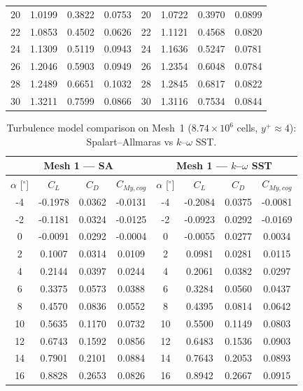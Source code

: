 \begin{table}[!ht]
\begin{tabular}{c c c c | c c c c}
20 & 1.0199  & 0.3822 & 0.0753  & 20 & 1.0722  & 0.3970 & 0.0899 \\
22 & 1.0853  & 0.4502 & 0.0626  & 22 & 1.1121  & 0.4568 & 0.0820 \\
24 & 1.1309  & 0.5119 & 0.0943  & 24 & 1.1636  & 0.5247 & 0.0781 \\
26 & 1.2046  & 0.5903 & 0.0949  & 26 & 1.2354  & 0.6048 & 0.0784 \\
28 & 1.2489  & 0.6651 & 0.1032  & 28 & 1.2845  & 0.6817 & 0.0822 \\
30 & 1.3211  & 0.7599 & 0.0866  & 30 & 1.3116  & 0.7534 & 0.0844 \\
\hline
\end{tabular}
\end{table}

\begin{table}[!ht]
\centering
\caption{Turbulence model comparison on Mesh~1 ($8.74\times10^{6}$ cells, $y^{+}\approx 4$): Spalart--Allmaras vs $k$--$\omega$ SST.}
\label{tab:tm_mesh1}
\setlength{\tabcolsep}{6pt}
\renewcommand{\arraystretch}{1.15}
\begin{tabular}{c c c c | c c c c}
\hline
\multicolumn{4}{c|}{\textbf{Mesh 1 --- SA}} &
\multicolumn{4}{c}{\textbf{Mesh 1 --- $k$--$\omega$ SST}}\\
\hline
$\alpha$ [$^\circ$] & $C_L$ & $C_D$ & $C_{My,cog}$ &
$\alpha$ [$^\circ$] & $C_L$ & $C_D$ & $C_{My,cog}$\\
\hline
-4 & -0.1978 & 0.0362 & -0.0131 & -4 & -0.2084 & 0.0375 & -0.0081 \\
-2 & -0.1181 & 0.0324 & -0.0125 & -2 & -0.0923 & 0.0292 & -0.0169 \\
0  & -0.0091 & 0.0292 & -0.0004 & 0  & -0.0055 & 0.0277 & 0.0034 \\
2  & 0.1007  & 0.0314 & 0.0109  & 2  & 0.0981  & 0.0281 & 0.0115 \\
4  & 0.2144  & 0.0397 & 0.0244  & 4  & 0.2061  & 0.0382 & 0.0297 \\
6  & 0.3375  & 0.0573 & 0.0388  & 6  & 0.3284  & 0.0560 & 0.0437 \\
8  & 0.4570  & 0.0836 & 0.0552  & 8  & 0.4395  & 0.0814 & 0.0642 \\
10 & 0.5635  & 0.1170 & 0.0732  & 10 & 0.5500  & 0.1149 & 0.0803 \\
12 & 0.6743  & 0.1592 & 0.0856  & 12 & 0.6483  & 0.1536 & 0.0903 \\
14 & 0.7901  & 0.2101 & 0.0884  & 14 & 0.7643  & 0.2053 & 0.0893 \\
16 & 0.8828  & 0.2653 & 0.0826  & 16 & 0.8942  & 0.2667 & 0.0915 \\

\end{tabular}
\end{table}
